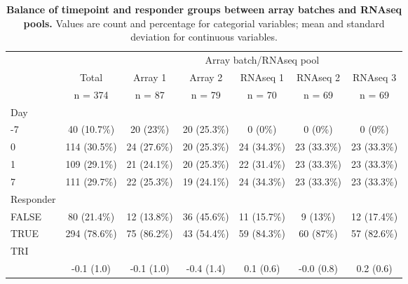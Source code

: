 \begin{table}[] 
 \centering 
 \caption{\textbf{Balance of timepoint and responder groups between array batches and \gls{RNAseq} pools.} Values are count and percentage for categorial variables; mean and standard deviation for continuous variables.}\label{tab:hird_batch_balance}
 \begin{tabular}{ l c c c c c c }
 \toprule
  &   &  \multicolumn{ 5 }{c}{ Array batch/\gls{RNAseq} pool }\\ 
  & Total & Array 1 & Array 2 & \gls{RNAseq} 1 & \gls{RNAseq} 2 & \gls{RNAseq} 3\\ 
  & n = 374 & n = 87 & n = 79 & n = 70 & n = 69 & n = 69 \\ 
  \midrule
 Day &   &   &   &   &   &  \\ 
 \hspace{6pt}    -7 & 40 (10.7\%) & 20 (23\%) & 20 (25.3\%) & 0 (0\%) & 0 (0\%) & 0 (0\%)\\ 
 \hspace{6pt}    0 & 114 (30.5\%) & 24 (27.6\%) & 20 (25.3\%) & 24 (34.3\%) & 23 (33.3\%) & 23 (33.3\%)\\ 
 \hspace{6pt}    1 & 109 (29.1\%) & 21 (24.1\%) & 20 (25.3\%) & 22 (31.4\%) & 23 (33.3\%) & 23 (33.3\%)\\ 
 \hspace{6pt}    7 & 111 (29.7\%) & 22 (25.3\%) & 19 (24.1\%) & 24 (34.3\%) & 23 (33.3\%) & 23 (33.3\%)\\ 
 Responder &   &   &   &   &   &  \\ 
 \hspace{6pt}    FALSE & 80 (21.4\%) & 12 (13.8\%) & 36 (45.6\%) & 11 (15.7\%) & 9 (13\%) & 12 (17.4\%)\\ 
 \hspace{6pt}    TRUE & 294 (78.6\%) & 75 (86.2\%) & 43 (54.4\%) & 59 (84.3\%) & 60 (87\%) & 57 (82.6\%)\\ 
 TRI &   &   &   &   &   &  \\ 
 \hspace{6pt}   & -0.1 (1.0) & -0.1 (1.0) & -0.4 (1.4) & 0.1 (0.6) & -0.0 (0.8) & 0.2 (0.6)\\ 
 \bottomrule
 
 \end{tabular}
 \end{table}
